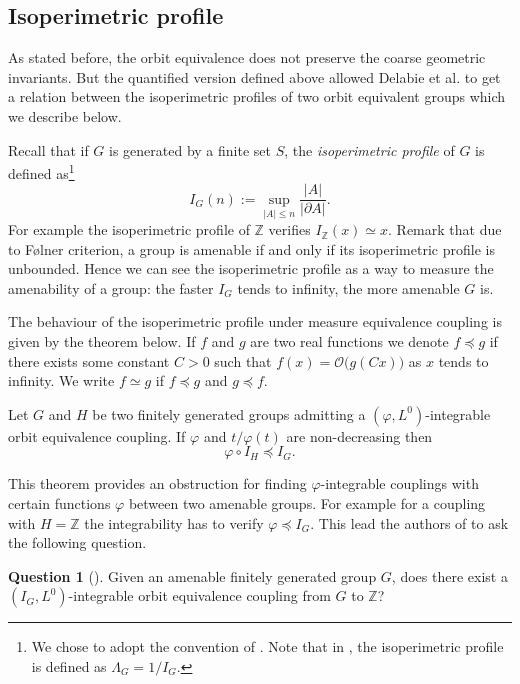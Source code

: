 \documentclass[english, 11pt, a4paper]{article}
\newcommand{\deffont}[1]{\emph{#1}}
\theoremstyle{definition}
\newtheorem{Q}[Def]{Question}
\numberwithin{equation}{section}
\newcommand{\bZ}{\mathbb{Z}}
\newcommand{\profile}{I}
\begin{document}
\subsection{Isoperimetric profile}\label{Subsec:IP}
As stated before, the orbit equivalence does not preserve the coarse geometric 
invariants. But the quantified version defined above allowed Delabie
et al. \cite{DKLMT} to get a relation between the isoperimetric profiles of two
orbit equivalent groups which we describe below.

Recall that if $G$ is generated by a finite set $S$, the \deffont{isoperimetric
  profile} of $G$ is defined as\footnote{We chose to adopt the convention of
  \cite{DKLMT}. Note that in \cite{BZ}, the isoperimetric profile is defined as
  $\Lambda_G=1/\profile_G$.} 
\begin{equation*}
  \profile_{G}(n):= \sup_{|A|\leq n} \frac{|A|}{|\partial A|}.
\end{equation*}
For example the isoperimetric profile of $\bZ$ verifies $\profile_{\bZ}(x) \simeq x$. 
Remark that due to Følner criterion, a group is amenable if and only if its
isoperimetric profile is unbounded. Hence we can see the isoperimetric profile
as a way to measure the amenability of a group: the faster $\profile_G$ tends to
infinity, the more amenable $G$ is.


The behaviour of the isoperimetric profile under measure equivalence
coupling is given by the theorem below. If $f$ and $g$ are two real functions we
denote $f \preccurlyeq g$ if there exists some constant $C>0$ such that
$f(x)=\mathcal{O}\big(g(Cx)\big)$ as $x$ tends to infinity. We write $f\simeq g$
if $f \preccurlyeq g$ and $g\preccurlyeq f$.

\begin{Th} \label{Th:ProfiletOE}
  Let $G$ and $H$ be two finitely generated groups admitting a
  $(\varphi,L^0)$-integrable orbit equivalence coupling. If $\varphi$ and
  $t/\varphi(t)$ are non-decreasing then
  \begin{equation*}
    \varphi \circ \profile_{H} \preccurlyeq \profile_G.
  \end{equation*}
\end{Th}

This theorem provides an obstruction for finding $\varphi$-integrable couplings
with certain functions $\varphi$ between two amenable groups. For example
for a coupling with $H=\bZ$ the integrability has to verify $\varphi \preccurlyeq
I_G$.
This lead the authors of \cite{DKLMT} to ask the following question.
\begin{Q}[{\cite[Question 1.2]{DKLMT}}]\label{Q:DKLMTZ}
  Given an amenable finitely generated group $G$, does there exist a
  $(I_G,L^0)$-integrable orbit equivalence coupling from $G$ to $\bZ$?
\end{Q}
\end{document}
